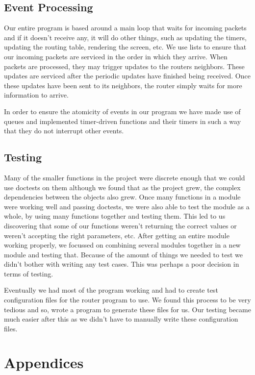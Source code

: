 \documentclass[11pt]{article} %
\begin{document}
\subsection{Event Processing}
Our entire program is based around a main loop that waits for incoming packets and if it doesn't receive any, it will do other things, such as updating the timers, updating the routing table, rendering the screen, etc. We use lists to ensure that our incoming packets are serviced in the order in which they arrive. When packets are processed, they may trigger updates to the routers neighbors. These updates are serviced after the periodic updates have finished being received. Once these updates have been sent to its neighbors, the router simply waits for more information to arrive.

In order to ensure the atomicity of events in our program we have made use of queues and implemented timer-driven functions and their timers in such a way that they do not  interrupt other events.   


\subsection{Testing}
Many of the smaller functions in the project were discrete enough that we could use doctests on them although we found that as the project grew, the complex dependencies between the objects also grew. Once many functions in a module were working well and passing doctests, we were also able to test the module as a whole, by using many functions together and testing them. This led to us discovering that some of our functions weren't returning the correct values or weren't accepting the right parameters, etc. After getting an entire module working properly, we focussed on combining several modules together in a new module and testing that. Because of the amount of things we needed to test we didn't bother with writing any test cases. This was perhaps a poor decision in terms of testing.

Eventually we had most of the program working and had to create test configuration files for the router program to use. We found this process to be very tedious and so, wrote a program to generate these files for us. Our testing became much easier after this as we didn't have to manually write these configuration files.

\newpage
\section{Appendices}
\end{document}
